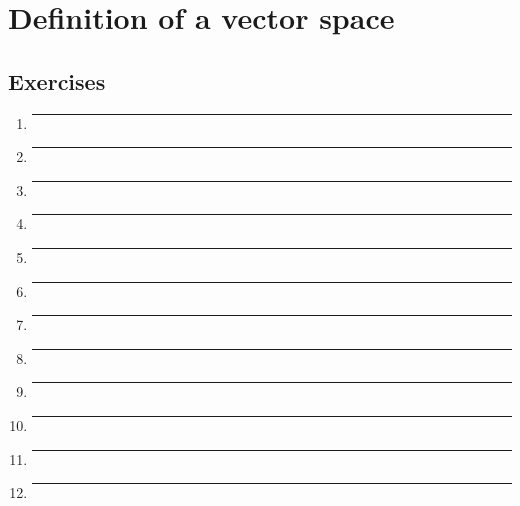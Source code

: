 \section{Definition of a vector space}
\subsection{Exercises}

\begin{enumerate}[label=\textbf{\arabic*}]

  \item{
    \lipsum[66]
    \bigbreak
    \hrule
    \bigbreak
  }

  \item{
    \lipsum[75]
    \bigbreak
    \hrule
    \bigbreak
  }

  \item{
    \lipsum[74]
    \bigbreak
    \hrule
    \bigbreak
  }

  \item{
    \lipsum[64]
    \bigbreak
    \hrule
    \bigbreak
  }

  \item{
    \lipsum[2]
    \bigbreak
    \hrule
    \bigbreak
  }

  \item{
    \lipsum[50]
    \bigbreak
    \hrule
    \bigbreak
  }

  \item{
    \lipsum[4]
    \bigbreak
    \hrule
    \bigbreak
  }

  \item{
    \lipsum[17]
    \bigbreak
    \hrule
    \bigbreak
  }

  \item{
    \lipsum[6]
    \bigbreak
    \hrule
    \bigbreak
  }

  \item{
    \lipsum[7]
    \bigbreak
    \hrule
    \bigbreak
  }

  \item{
    \lipsum[8]
    \bigbreak
    \hrule
    \bigbreak
  }

  \item{
    \lipsum[13] %
    \bigbreak
    \hrule
    \bigbreak
  }

\end{enumerate}